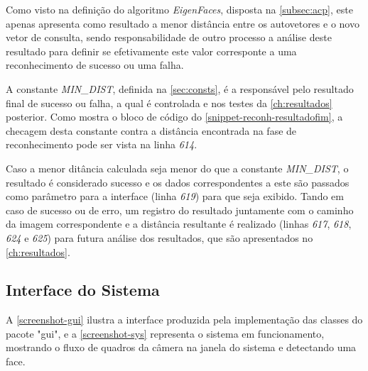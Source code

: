 Como visto na definição do algoritmo \textit{EigenFaces}, disposta na \autoref{subsec:acp}, este apenas apresenta como resultado a menor distância entre os autovetores e o novo vetor de consulta, sendo responsabilidade de outro processo a análise deste resultado para definir se efetivamente este valor corresponte a uma reconhecimento de sucesso ou uma falha.

A constante \textit{MIN\_DIST}, definida na \autoref{sec:consts}, é a responsável pelo resultado final de sucesso ou falha, a qual é controlada e nos testes da \autoref{ch:resultados} posterior. Como mostra o bloco de código do \autoref{snippet-reconh-resultadofim}, a checagem desta constante contra a distância encontrada na fase de reconhecimento pode ser vista na linha \textit{614}.



\codigoJava



Caso a menor ditância calculada seja menor do que a constante \textit{MIN\_DIST}, o resultado é considerado sucesso e os dados correspondentes a este são passados como parâmetro para a interface (linha \textit{619}) para que seja exibido. Tando em caso de sucesso ou de erro, um registro do resultado juntamente com o caminho da imagem correspondente e a distância resultante é realizado (linhas \textit{617}, \textit{618}, \textit{624} e \textit{625}) para futura análise dos resultados, que são apresentados no  \autoref{ch:resultados}.


\subsection{Interface do Sistema}\label{sec:interface}


A \autoref{screenshot-gui} ilustra a interface produzida pela implementação das classes do pacote "gui", e a \autoref{screenshot-sys} representa o sistema em funcionamento, mostrando o fluxo de quadros da câmera na janela do sistema e detectando uma face.

